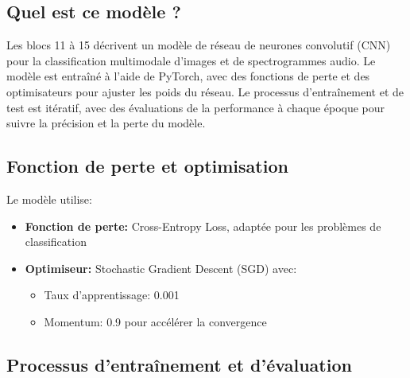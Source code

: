 \documentclass[11pt,a4paper]{article}
\begin{document}
\subsection{Quel est ce modèle ?}
\label{subsec:quel_modele}

Les blocs 11 à 15 décrivent un modèle de réseau de neurones convolutif (CNN) pour la classification multimodale d'images et de spectrogrammes audio. Le modèle est entraîné à l'aide de PyTorch, avec des fonctions de perte et des optimisateurs pour ajuster les poids du réseau. Le processus d'entraînement et de test est itératif, avec des évaluations de la performance à chaque époque pour suivre la précision et la perte du modèle.

\subsection{Fonction de perte et optimisation}
\label{subsec:loss_optim}

Le modèle utilise:
\begin{itemize}
    \item \textbf{Fonction de perte:} Cross-Entropy Loss, adaptée pour les problèmes de classification
    \item \textbf{Optimiseur:} Stochastic Gradient Descent (SGD) avec:
    \begin{itemize}
        \item Taux d'apprentissage: 0.001
        \item Momentum: 0.9 pour accélérer la convergence
    \end{itemize}
\end{itemize}

\subsection{Processus d'entraînement et d'évaluation}
\label{subsec:training}
\end{document}
